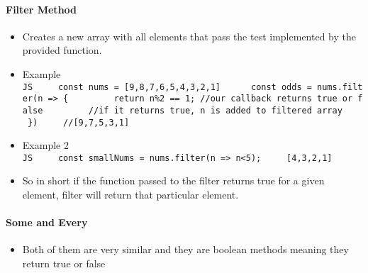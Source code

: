 \documentclass[
  paper=a4,
  ,captions=tableheading
]{scrartcl}
\providecommand{\tightlist}{%
  \setlength{\itemsep}{0pt}\setlength{\parskip}{0pt}}
\begin{document}
\hypertarget{filter-method}{%
\paragraph{Filter Method}\label{filter-method}}

\begin{itemize}
\tightlist
\item
  Creates a new array with all elements that pass the test implemented
  by the provided function.
\item
  Example
  \texttt{JS\ \ \ \ \ const\ nums\ =\ {[}9,8,7,6,5,4,3,2,1{]}\ \ \ \ \ \ const\ odds\ =\ nums.filter(n\ =\textgreater{}\ \{\ \ \ \ \ \ \ \ \ return\ n\%2\ ==\ 1;\ //our\ callback\ returns\ true\ or\ false\ \ \ \ \ \ \ \ \ //if\ it\ returns\ true,\ n\ is\ added\ to\ filtered\ array\ \ \ \ \ \})\ \ \ \ \ //{[}9,7,5,3,1{]}}
\item
  Example 2
  \texttt{JS\ \ \ \ \ const\ smallNums\ =\ nums.filter(n\ =\textgreater{}\ n\textless{}5);\ \ \ \ \ {[}4,3,2,1{]}}
\item
  So in short if the function passed to the filter returns true for a
  given element, filter will return that particular element.
\end{itemize}

\hypertarget{some-and-every}{%
\paragraph{Some and Every}\label{some-and-every}}

\begin{itemize}
\tightlist
\item
  Both of them are very similar and they are boolean methods meaning
  they return true or false
\end{itemize}
\end{document}
